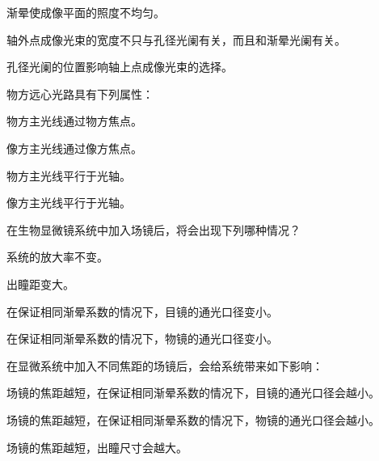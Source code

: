 \documentclass[standard, analysis, notocnum]{ExBook}
\newcommand{\answerarea}[1][8cm]{%
  \par\vspace{2mm}%
  \noindent{\color{themeColor!35}\rule{\linewidth}{0.4pt}}\par
  \noindent\begin{minipage}[t][#1][t]{\linewidth}\vspace{0pt}\end{minipage}\par
  \noindent{\color{themeColor!35}\rule{\linewidth}{0.4pt}}\par
}
\begin{document}
\begin{qitems}
\begin{bbox}
\par\noindent\hspace{2em}渐晕使成像平面的照度不均匀。
\par\noindent\hspace{2em}轴外点成像光束的宽度不只与孔径光阑有关，而且和渐晕光阑有关。
\par\noindent\hspace{2em}孔径光阑的位置影响轴上点成像光束的选择。
\answerarea[3.5cm]
\end{bbox}
\begin{bbox}
\qitem 物方远心光路具有下列属性：
\par\noindent\hspace{2em}物方主光线通过物方焦点。
\par\noindent\hspace{2em}像方主光线通过像方焦点。
\par\noindent\hspace{2em}物方主光线平行于光轴。
\par\noindent\hspace{2em}像方主光线平行于光轴。
\answerarea[3.5cm]
\end{bbox}
\begin{bbox}
\qitem 在生物显微镜系统中加入场镜后，将会出现下列哪种情况？
\par\noindent\hspace{2em}系统的放大率不变。
\par\noindent\hspace{2em}出瞳距变大。
\par\noindent\hspace{2em}在保证相同渐晕系数的情况下，目镜的通光口径变小。
\par\noindent\hspace{2em}在保证相同渐晕系数的情况下，物镜的通光口径变小。
\answerarea[3.5cm]
\end{bbox}
\begin{bbox}
\qitem 在显微系统中加入不同焦距的场镜后，会给系统带来如下影响：
\par\noindent\hspace{2em}场镜的焦距越短，在保证相同渐晕系数的情况下，目镜的通光口径会越小。
\par\noindent\hspace{2em}场镜的焦距越短，在保证相同渐晕系数的情况下，物镜的通光口径会越小。
\par\noindent\hspace{2em}场镜的焦距越短，出瞳尺寸会越大。

\end{bbox}
\end{qitems}
\end{document}
